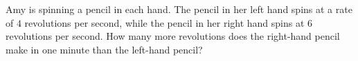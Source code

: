 Amy is spinning a pencil in each hand. The pencil in her left hand spins at a rate of $4$ revolutions per second, while the pencil in her right hand spins at $6$ revolutions per second. How many more revolutions does the right-hand pencil make in one minute than the left-hand pencil?
